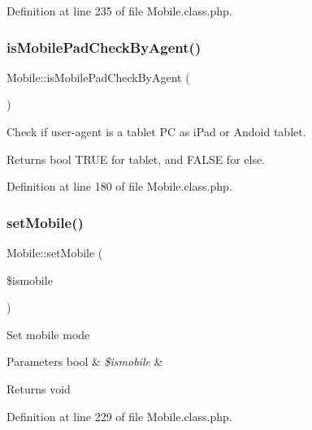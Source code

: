 Definition at line 235 of file Mobile.\+class.\+php.

\hypertarget{classMobile_a137e8bae3e1f34b018864d2df624113f}{}\label{classMobile_a137e8bae3e1f34b018864d2df624113f} 
\subsubsection{\texorpdfstring{is\+Mobile\+Pad\+Check\+By\+Agent()}{isMobilePadCheckByAgent()}}
{\footnotesize\ttfamily Mobile\+::is\+Mobile\+Pad\+Check\+By\+Agent (\begin{DoxyParamCaption}{ }\end{DoxyParamCaption})}

Check if user-\/agent is a tablet PC as i\+Pad or Andoid tablet.

\begin{DoxyReturn}{Returns}
bool T\+R\+UE for tablet, and F\+A\+L\+SE for else. 
\end{DoxyReturn}


Definition at line 180 of file Mobile.\+class.\+php.

\hypertarget{classMobile_a82db2bb3415147c24d429bb065542053}{}\label{classMobile_a82db2bb3415147c24d429bb065542053} 
\subsubsection{\texorpdfstring{set\+Mobile()}{setMobile()}}
{\footnotesize\ttfamily Mobile\+::set\+Mobile (\begin{DoxyParamCaption}\item[{}]{\$ismobile }\end{DoxyParamCaption})}

Set mobile mode


\begin{DoxyParams}[1]{Parameters}
bool & {\em \$ismobile} & \\
\hline
\end{DoxyParams}
\begin{DoxyReturn}{Returns}
void 
\end{DoxyReturn}


Definition at line 229 of file Mobile.\+class.\+php.



